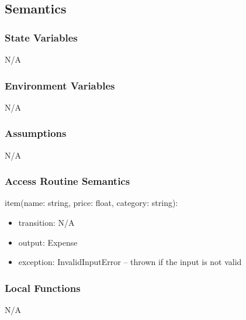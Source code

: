 \documentclass[12pt, titlepage]{article}
\begin{document}
\subsection{Semantics}

\subsubsection{State Variables}
N/A

\subsubsection{Environment Variables}
N/A

\subsubsection{Assumptions}
N/A

\subsubsection{Access Routine Semantics}

\noindent item(name: string, price: float, category: string):
\begin{itemize}
\item transition: N/A
\item output: Expense
\item exception: InvalidInputError -- thrown if the input is not valid
\end{itemize}

\subsubsection{Local Functions}
N/A

\newpage





\end{document}
